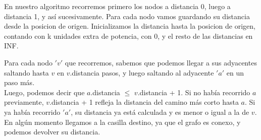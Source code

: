 \documentclass[11pt, a4paper, twoside]{article}
\begin{document}
{}
En nuestro algoritmo recorremos primero los nodos a distancia 0, luego a distancia 1, y así sucesivamente.
Para cada nodo vamos guardando su distancia desde la posicion de origen.
Inicializamos la distancia hasta la posicion de origen, contando con k unidades extra de potencia, con 0, y el 
resto de las distancias en INF.

Para cada nodo $'v'$ que recorremos, sabemos que podemos llegar a sus adyacentes saltando hasta $v$ en $v$.distancia 
pasos, y luego saltando al adyacente $'a'$ en un paso más. \\
Luego, podemos decir que $a$.distancia $\le$ $v$.distancia + 1. Si no había recorrido $a$ previamente, 
$v$.distancia + 1 refleja la distancia del camino más corto hasta $a$. Si ya había recorrido $'a'$, su 
distancia ya está calculada y es menor o igual a la de $v$. En algún momento llegamos a la casilla destino, 
ya que el grafo es conexo, y podemos devolver su distancia. \\ 
\end{document}
